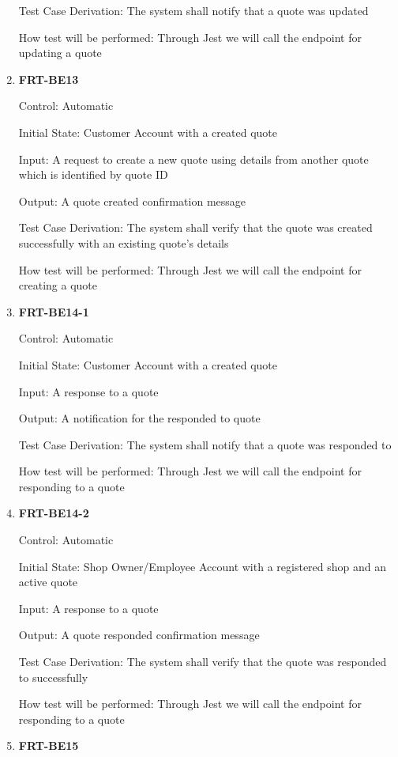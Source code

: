 \documentclass[12pt, titlepage]{article}
\begin{document}
\begin{enumerate}
	      Test Case Derivation: The system shall notify that a quote was updated

	      How test will be performed: Through Jest we will call the endpoint for updating a quote

	\item \textbf{FRT-BE13}

	      Control: Automatic

	      Initial State: Customer Account with a created quote

	      Input: A request to create a new quote using details from another quote which is identified by
	      quote ID

	      Output: A quote created confirmation message

	      Test Case Derivation: The system shall verify that the quote was created successfully with an
	      existing quote's details

	      How test will be performed: Through Jest we will call the endpoint for creating a quote

	\item \textbf{FRT-BE14-1}

	      Control: Automatic

	      Initial State: Customer Account with a created quote

	      Input: A response to a quote

	      Output: A notification for the responded to quote

	      Test Case Derivation: The system shall notify that a quote was responded to

	      How test will be performed: Through Jest we will call the endpoint for responding to a quote

	\item \textbf{FRT-BE14-2}

	      Control: Automatic

	      Initial State: Shop Owner/Employee Account with a registered shop and an active quote

	      Input: A response to a quote

	      Output: A quote responded confirmation message

	      Test Case Derivation: The system shall verify that the quote was responded to successfully

	      How test will be performed: Through Jest we will call the endpoint for responding to a quote

	\item \textbf{FRT-BE15}


\end{enumerate}
\end{document}
